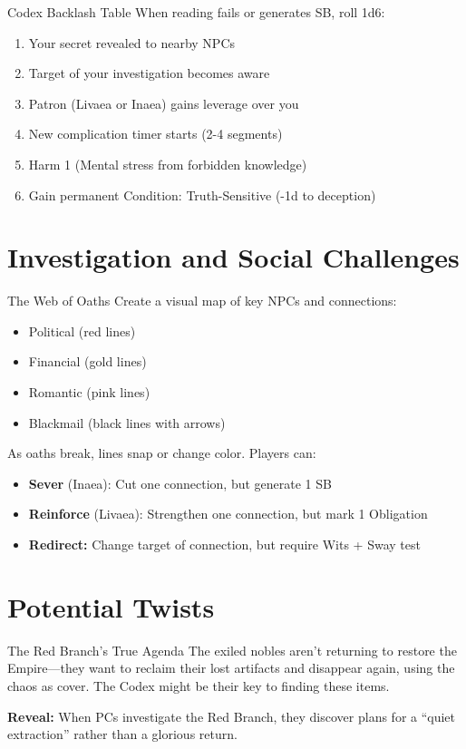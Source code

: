 \documentclass[11pt]{article}
\begin{document}
\begin{mechanicsbox}{Codex Backlash Table}
When reading fails or generates SB, roll 1d6:
\begin{enumerate}
    \item Your secret revealed to nearby NPCs
    \item Target of your investigation becomes aware
    \item Patron (Livaea or Inaea) gains leverage over you
    \item New complication timer starts (2-4 segments)
    \item Harm 1 (Mental stress from forbidden knowledge)
    \item Gain permanent Condition: Truth-Sensitive (-1d to deception)
\end{enumerate}
\end{mechanicsbox}

\section*{Investigation and Social Challenges}

\begin{mechanicsbox}{The Web of Oaths}
Create a visual map of key NPCs and connections:
\begin{itemize}
    \item Political (red lines)
    \item Financial (gold lines)
    \item Romantic (pink lines)
    \item Blackmail (black lines with arrows)
\end{itemize}
As oaths break, lines snap or change color. Players can:
\begin{itemize}
    \item \textbf{Sever} (Inaea): Cut one connection, but generate 1 SB
    \item \textbf{Reinforce} (Livaea): Strengthen one connection, but mark 1 Obligation
    \item \textbf{Redirect:} Change target of connection, but require Wits + Sway test
\end{itemize}
\end{mechanicsbox}

\section*{Potential Twists}

\begin{mechanicsbox}{The Red Branch's True Agenda}
The exiled nobles aren't returning to restore the Empire---they want to reclaim their lost artifacts and disappear again, using the chaos as cover. The Codex might be their key to finding these items.

\textbf{Reveal:} When PCs investigate the Red Branch, they discover plans for a ``quiet extraction'' rather than a glorious return.
\end{mechanicsbox}
\end{document}
